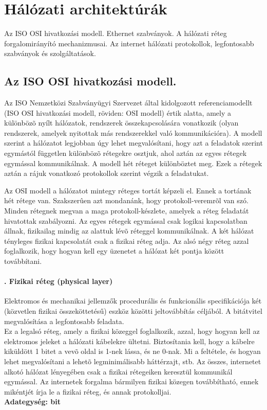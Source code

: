 \section{Hálózati architektúrák}
{\footnotesize Az ISO OSI hivatkozási modell. Ethernet szabványok. A hálózati réteg forgalomirányító mechanizmusai. Az internet hálózati protokollok, legfontosabb szabványok és szolgáltatások.}
\subsection{Az ISO OSI hivatkozási modell.}
Az ISO Nemzetközi Szabványügyi Szervezet által kidolgozott referenciamodellt (ISO OSI hivatkozási modell, röviden: OSI modell) értik alatta, amely a különbözõ nyílt hálózatok, rendszerek összekapcsolására vonatkozik (olyan rendszerek, amelyek nyitottak más rendszerekkel való kommunikációra). A modell szerint a hálózatot legjobban úgy lehet megvalósítani, hogy azt a feladatok szerint egymástól független különbözõ rétegekre osztjuk, ahol aztán az egyes rétegek egymással kommunikálnak. A modell hét réteget különböztet meg. Ezek a rétegek aztán a rájuk vonatkozó protokollok szerint végzik a feladatukat.

Az OSI modell a hálózatot mintegy réteges tortát képzeli el. Ennek a tortának hét rétege van. Szakszerûen azt mondanánk, hogy protokoll-veremrõl van szó. Minden rétegnek megvan a maga protokoll-készlete, amelyek a réteg feladatát hivatottak szabályozni. Az egyes rétegek egymással csak logikai kapcsolatban állnak, fizikailag mindig az alattuk lévõ réteggel kommunikálnak. A két hálózat tényleges fizikai kapcsolatát csak a fizikai réteg adja. Az alsó négy réteg azzal foglalkozik, hogy hogyan kell egy üzenetet a hálózat két pontja között továbbítani.
\setcounter{paragraph}{1}
\paragraph[Fizikai réteg]{. Fizikai réteg (physical layer)}
Elektromos és mechanikai jellemzők procedurális és funkcionális specifikációja két (közvetlen fizikai összeköttetésű) eszköz közötti jeltovábbítás céljából. A bitátvitel megvalósítása a legfontosabb feladata.\\
{\footnotesize Ez a legalsó réteg, amely a fizikai közeggel foglalkozik, azzal, hogy hogyan kell az elektromos jeleket a hálózati kábelekre ültetni. Biztosítania kell, hogy a kábelre kiküldött 1 bitet a vevõ oldal is 1-nek lássa, és ne 0-nak. Mi a feltétele, és hogyan lehet megvalósítani a lehetõ legminimálisabb háttérzajt, stb. Az összes, internetet alkotó hálózat lényegében csak a fizikai rétegeiken keresztül kommunikál egymással. Az internetek forgalma bármilyen fizikai közegen továbbítható, ennek mikéntjét írja le a fizikai réteg, és annak protokolljai.}\\
\textbf{Adategység: bit}
